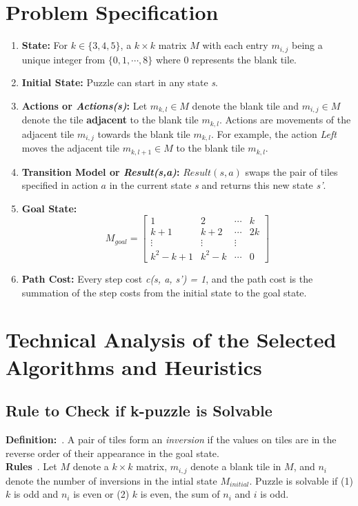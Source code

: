 \documentclass[runningheads]{llncs}
\begin{document}
\section{Problem Specification}
\begin{enumerate}
    \item \textbf{State:} For \( k \in \{3, 4, 5\} \),  a \( k \times k \) matrix \( M \) with each entry \( m_{i, j} \) being a unique integer from \( \{0, 1, \cdots, 8 \} \) where 0 represents the blank tile.
    \item \textbf{Initial State:} Puzzle can start in any state \textit{s}.
    \item \textbf{Actions or \textit{Actions(s)}:} Let \( m_{k, l} \in M \) denote the blank tile and \( m_{i, j} \in M \) denote the tile \textbf{adjacent} to the blank tile \( m_{k, l} \).
    Actions are movements of the adjacent tile \( m_{i, j} \) towards the blank tile \( m_{k, l} \). For example, the action \textit{Left} moves the adjacent tile \( m_{k, l+1} \in M \) to the blank tile \( m_{k, l} \).
    \item \textbf{Transition Model or \textit{Result(s,a)}:} \( Result(s, a) \) swaps the pair of tiles specified in action \( a \) in the current state \textit{s} and returns this new state \textit{s'}.
    \item \textbf{Goal State:} 
    \[
    M_{goal}= \begin{bmatrix}
        1 & 2 & \cdots & k \\
        k+1 & k+2 & \cdots & 2k \\
        \vdots & \vdots & \vdots \\
        k^2 - k + 1 & k^2 - k & \cdots & 0
        \end{bmatrix}
    \]
    \item \textbf{Path Cost:} Every step cost \textit{c(s, a, s') = 1}, and the path cost is the summation of the step costs from the initial state to the goal state.
\end{enumerate}

\section{Technical Analysis of the Selected Algorithms and Heuristics}
\label{section2}

\subsection{Rule to Check if k-puzzle is Solvable}
\textbf{Definition:}~\cite{princeton_computer_science_8-puzzle_nodate}. A pair of tiles form an \textit{inversion} if the values on tiles are in the reverse order of their appearance in the goal state. \\
\textbf{Rules}~\cite{princeton_computer_science_8-puzzle_nodate}. Let \( M \) denote a \( k \times k \) matrix, \( m_{i, j} \) denote a blank tile in \( M \), and \( n_i \) denote the number of inversions in the intial state \( M_{initial} \). Puzzle is solvable if (1) \( k \) is odd and \( n_i \) is even or (2) \( k \) is even, the sum of \(n_i \) and \( i \) is odd.
\end{document}
